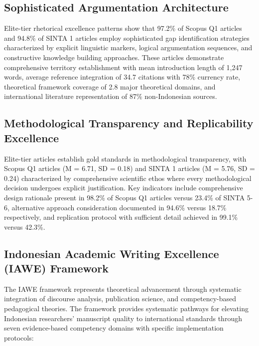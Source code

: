 \documentclass[journal,article,submit,pdftex,moreauthors]{Definitions/mdpi}
\begin{document}
\subsection{Sophisticated Argumentation Architecture}

Elite-tier rhetorical excellence patterns show that 97.2\% of Scopus Q1 articles and 94.8\% of SINTA 1 articles employ sophisticated gap identification strategies characterized by explicit linguistic markers, logical argumentation sequences, and constructive knowledge building approaches. These articles demonstrate comprehensive territory establishment with mean introduction length of 1,247 words, average reference integration of 34.7 citations with 78\% currency rate, theoretical framework coverage of 2.8 major theoretical domains, and international literature representation of 87\% non-Indonesian sources.

\subsection{Methodological Transparency and Replicability Excellence}

Elite-tier articles establish gold standards in methodological transparency, with Scopus Q1 articles (M = 6.71, SD = 0.18) and SINTA 1 articles (M = 5.76, SD = 0.24) characterized by comprehensive scientific ethos where every methodological decision undergoes explicit justification. Key indicators include comprehensive design rationale present in 98.2\% of Scopus Q1 articles versus 23.4\% of SINTA 5-6, alternative approach consideration documented in 94.6\% versus 18.7\% respectively, and replication protocol with sufficient detail achieved in 99.1\% versus 42.3\%.

\subsection{Indonesian Academic Writing Excellence (IAWE) Framework}

The IAWE framework represents theoretical advancement through systematic integration of discourse analysis, publication science, and competency-based pedagogical theories. The framework provides systematic pathways for elevating Indonesian researchers' manuscript quality to international standards through seven evidence-based competency domains with specific implementation protocols:
\end{document}
